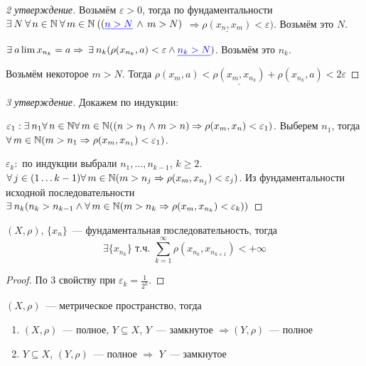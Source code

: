 \documentclass[document]{subfiles}
\begin{document}
\begin{proof}[2 утверждение]
    Возьмём $\varepsilon > 0$, тогда по фундаментальности $\exists N  \: \forall n \in \bN  \: \forall m \in \bN \: ((\textcolor{blue}{\underline{n > N}} \, \land \, m > N) $ $\Rightarrow \underline{\rho(x_n, x_m)} < \varepsilon)$. Возьмём это $N$.

    $\exists a \liml x_{n_k} = a \Rightarrow \: \exists n_k (\rho(x_{n_k}, a) < \varepsilon \land \textcolor{blue}{\underline{n_k > N}})$. Возьмём это $n_k$.

    Возьмём некоторое $m > N$. Тогда $\rho(x_m, a) < \underline{\rho(x_m, x_{n_k})} + \rho(x_{n_k}, a) < 2 \varepsilon$
\end{proof}
\begin{proof}[3 утверждение]
    Докажем по индукции:

    $\varepsilon_1: \exists n_1 \forall n \in \bN \forall m \in \bN ((n > n_1 \land m > n) \Rightarrow \rho(x_m,x_n) < \varepsilon_1)$. Выберем $n_1$, тогда $\forall m \in \bN (m > n_1 \Rightarrow \rho(x_m, x_{n_1}) < \varepsilon_1)$.

    $\varepsilon_k:$ по индукции выбрали $n_1, \ldots, n_{k-1}$, $k \geq 2$. $\forall j \in ( 1 \ldots k-1 ) \forall m \in \bN (m > n_j \Rightarrow \rho (x_m, x_{n_j}) < \varepsilon_j)$.
    Из фундаментальности исходной последовательности $\exists n_k (n_k > n_{k-1} \land \forall m \in \bN (m > n_k \Rightarrow \rho (x_m, x_{n_k}) < \varepsilon_k))$
\end{proof}

\begin{corollary}
\label{cor:subseq-metric-sum-converges}
    $(X, \rho)$, $\{x_n\}$~--- фундаментальная последовательность, тогда 
    \[ \exists \{x_{n_k} \} \text { т.ч. } \sum_{k=1}^\infty \rho(x_{n_k}, x_{n_{k+1}}) < + \infty \]
\end{corollary}
\begin{proof}
    По 3 свойству при $\varepsilon_k = \frac{1}{2^k}$.
\end{proof}

\begin{theorem}
\label{theo:closed-subset-complete-space}
    $(X,\rho)$~--- метрическое пространство, тогда
    \begin{enumerate}
        \item $(X, \rho)$~--- полное, $Y \subseteq X$, $Y$~--- замкнутое $\Rightarrow (Y, \rho)$~--- полное
        \item $Y \subseteq X$, $(Y,\rho)$~--- полное $\Rightarrow$ $Y$~--- замкнутое
    \end{enumerate}
\end{theorem}
\end{document}
